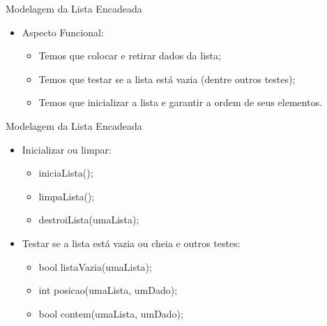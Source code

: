 \documentclass[12pt,table,xcolor={dvipsnames}]{beamer}
\begin{document}
\begin{frame}[fragile]{Modelagem da Lista Encadeada}

\begin{itemize}
\item Aspecto Funcional:
\begin{itemize}
\item Temos que colocar e retirar dados da lista;
\item Temos que testar se a lista está vazia (dentre outros testes);
\item Temos que inicializar a lista e garantir a ordem de seus elementos.
\end{itemize}
\end{itemize}
\end{frame}

\begin{frame}[fragile]{Modelagem da Lista Encadeada}

\begin{itemize}
\item Inicializar ou limpar:
\begin{itemize}
\item iniciaLista();
\item limpaLista();
\item destroiLista(umaLista);
\end{itemize}
\item Testar se a lista está vazia ou cheia e outros testes:
\begin{itemize}
\item bool listaVazia(umaLista);
\item int posicao(umaLista, umDado);
\item bool contem(umaLista, umDado);
\end{itemize}
\end{itemize}
\end{frame}
\end{document}
